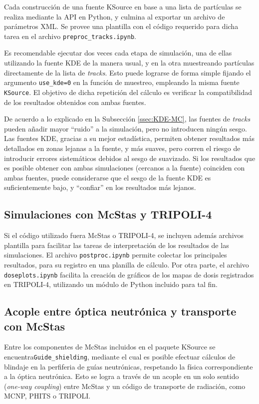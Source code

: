 Cada construcción de una fuente KSource en base a una lista de partículas se realiza mediante la API en Python, y culmina al exportar un archivo de parámetros XML. Se provee una plantilla con el código requerido para dicha tarea en el archivo \verb|preproc_tracks.ipynb|.

Es recomendable ejecutar dos veces cada etapa de simulación, una de ellas utilizando la fuente KDE de la manera usual, y en la otra muestreando partículas directamente de la lista de \emph{tracks}. Esto puede lograrse de forma simple fijando el argumento \verb|use_kde=0| en la función de muestreo, empleando la misma fuente \verb|KSource|. El objetivo de dicha repetición del cálculo es verificar la compatibilidad de los resultados obtenidos con ambas fuentes.

De acuerdo a lo explicado en la Subsección \ref{ssec:KDE-MC}, las fuentes de \emph{tracks} pueden añadir mayor ``ruido'' a la simulación, pero no introducen ningún sesgo. Las fuentes KDE, gracias a su mejor estadística, permiten obtener resultados más detallados en zonas lejanas a la fuente, y más suaves, pero corren el riesgo de introducir errores sistemáticos debidos al sesgo de suavizado. Si los resultados que es posible obtener con ambas simulaciones (cercanos a la fuente) coinciden con ambas fuentes, puede considerarse que el sesgo de la fuente KDE es suficientemente bajo, y ``confiar'' en los resultados más lejanos.


\subsection{Simulaciones con McStas y TRIPOLI-4}

Si el código utilizado fuera McStas o TRIPOLI-4, se incluyen además archivos plantilla para facilitar las tareas de interpretación de los resultados de las simulaciones. El archivo \verb|postproc.ipynb| permite colectar los principales resultados, para su registro en una planilla de cálculo. Por otra parte, el archivo \verb|doseplots.ipynb| facilita la creación de gráficos de los mapas de dosis registrados en TRIPOLI-4, utilizando un módulo de Python incluido para tal fin.


\subsection{Acople entre óptica neutrónica y transporte con McStas}

Entre los componentes de McStas incluidos en el paquete KSource se encuentra\linebreak \verb|Guide_shielding|, mediante el cual es posible efectuar cálculos de blindaje en la perfiferia de guías neutrónicas, respetando la física correspondiente a la óptica neutrónica. Esto se logra a través de un acople en un solo sentido (\emph{one-way coupling}) entre McStas y un código de transporte de radiación, como MCNP, PHITS o TRIPOLI.

